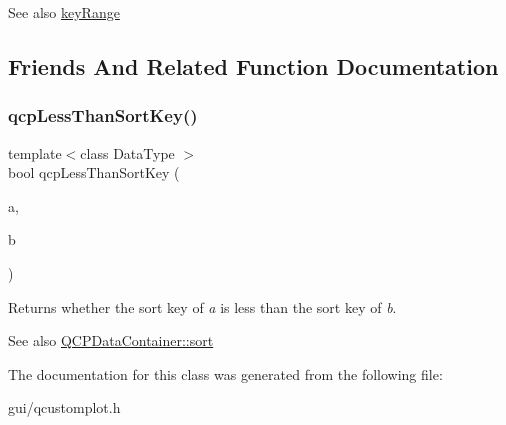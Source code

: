 \begin{DoxySeeAlso}{See also}
\hyperlink{classQCPDataContainer_aba6e1a93c21ccc56a432b4a02c9d0ed2}{key\+Range} 
\end{DoxySeeAlso}


\subsection{Friends And Related Function Documentation}
\mbox{\label{classQCPDataContainer_a74c5e06728cb6fa778a25d9ec0c4bd36}} 
\subsubsection{\texorpdfstring{qcp\+Less\+Than\+Sort\+Key()}{qcpLessThanSortKey()}}
{\footnotesize\ttfamily template$<$class Data\+Type $>$ \\
bool qcp\+Less\+Than\+Sort\+Key (\begin{DoxyParamCaption}\item[{const Data\+Type \&}]{a,  }\item[{const Data\+Type \&}]{b }\end{DoxyParamCaption})\hspace{0.3cm}{\ttfamily [related]}}

Returns whether the sort key of {\itshape a} is less than the sort key of {\itshape b}.

\begin{DoxySeeAlso}{See also}
\hyperlink{classQCPDataContainer_a75da92e33063b63d6da5014683591d45}{Q\+C\+P\+Data\+Container\+::sort} 
\end{DoxySeeAlso}


The documentation for this class was generated from the following file\+:\begin{DoxyCompactItemize}
\item 
gui/qcustomplot.\+h\end{DoxyCompactItemize}
